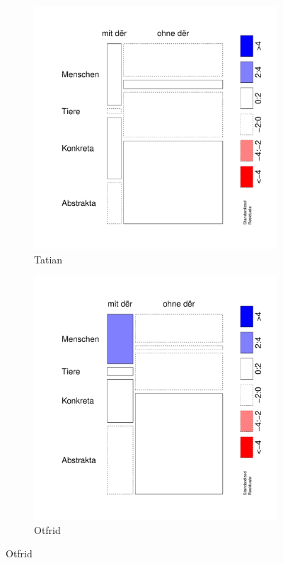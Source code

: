 \begin{figure}
\begin{subfigure}[b]{.5\linewidth}
  \includegraphics[height=.25\textheight]{generated/images/bel-hapaxe-residuals-T}
\caption {Tatian}
\end{subfigure}%
\begin{subfigure}[b]{.5\linewidth}
  \includegraphics[height=.25\textheight]{generated/images/bel-hapaxe-residuals-O}
\caption {Otfrid}
\end{subfigure}


\end{figure}
